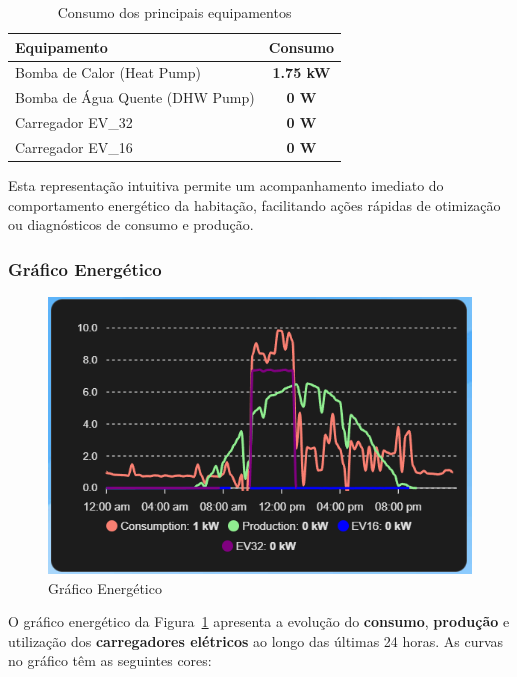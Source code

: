 \begin{table}[H]
\centering
\begin{tabular}{|l|c|}
\hline
\textbf{Equipamento} & \textbf{Consumo} \\
\hline
Bomba de Calor (Heat Pump) & \textbf{1.75 kW}  \\
Bomba de Água Quente (DHW Pump) & \textbf{0 W} \\
Carregador EV\_32 & \textbf{0 W} \\
Carregador EV\_16 & \textbf{0 W} \\
\hline
\end{tabular}
\caption{Consumo dos principais equipamentos}
\label{tab:consumos_equipamentos}
\end{table}

Esta representação intuitiva permite um acompanhamento imediato do comportamento energético da habitação, facilitando ações rápidas de otimização ou diagnósticos de consumo e produção.

\subsubsection{Gráfico Energético}
\begin{figure}[H]
    \centering
    \includegraphics[width=\textwidth]{images/grafico_energia.png}
    \caption{Gráfico Energético}
    \label{fig:grafico_energia.png}
\end{figure}

O gráfico energético da Figura~\ref{fig:grafico_energia.png} apresenta a evolução do \textbf{consumo}, \textbf{produção} e utilização dos \textbf{carregadores elétricos} ao longo das últimas 24 horas. As curvas no gráfico têm as seguintes cores:

